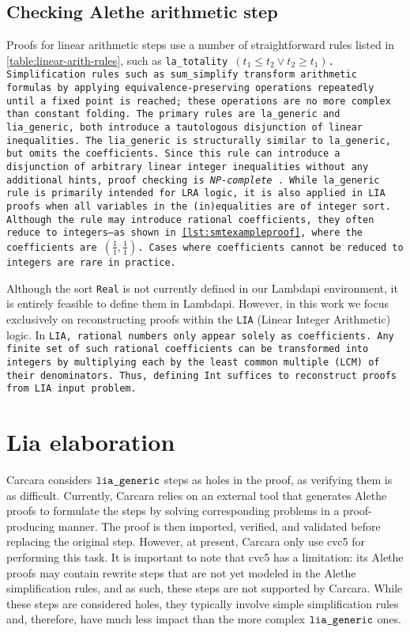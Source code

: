 \subsection{Checking Alethe arithmetic step}

Proofs for linear arithmetic steps use a number of straightforward rules listed in \cref{table:linear-arith-rules}, such as \tt{la\_totality} $(t_1 \leq t_2 \lor t_2 \geq t_1)$.
Simplification rules such as \tt{sum\_simplify} transform arithmetic formulas by applying equivalence-preserving operations repeatedly until a fixed point is reached; these operations are no more complex than constant folding.
The primary rules are \tt{la\_generic} and \tt{lia\_generic}, both introduce a tautologous disjunction of linear inequalities. The \tt{lia\_generic} is structurally similar to \tt{la\_generic}, but omits the coefficients.
Since this rule can introduce a disjunction of arbitrary linear integer inequalities without any additional hints, proof checking is \emph{NP-complete} \cite{Schrijver:lia}.
While \tt{la\_generic rule} is primarily intended for LRA logic, it is also applied in LIA proofs when all variables in the (in)equalities are of integer sort.
Although the rule may introduce rational coefficients, they often reduce to integers—as shown in \cref{lst:smtexampleproof}, where the coefficients are $(\frac{1}{1}, \frac{1}{1})$.
Cases where coefficients cannot be reduced to integers are rare in practice.

Although the sort \lstinline[language=SMT]{Real} is not currently defined in our Lambdapi environment, it is entirely feasible to define them in Lambdapi. However, in this work we focus exclusively on reconstructing proofs within the \texttt{LIA} (Linear Integer Arithmetic) logic.
In \tt{LIA}, rational numbers only appear solely as coefficients. Any finite set of such rational coefficients can be transformed into integers by multiplying each by the least common multiple (LCM) of their denominators.
Thus, defining \lstinline[language=SMT]{Int} suffices to reconstruct proofs from \tt{LIA} input problem.

\section{Lia elaboration}

Carcara considers $\tt{lia\_generic}$ steps as holes in the proof, as verifying them is as difficult.
Currently, Carcara relies on an external tool that generates Alethe proofs to formulate the steps by solving corresponding problems in a proof-producing manner.
The proof is then imported, verified, and validated before replacing the original step.
However, at present, Carcara only use cvc5 for performing this task.
It is important to note that cvc5 has a limitation: its Alethe proofs may contain rewrite steps that are not yet modeled in the Alethe simplification rules, and as such, these steps are not supported by Carcara.
While these steps are considered holes, they typically involve simple simplification rules and, therefore, have much less impact than the more complex $\tt{lia\_generic}$ ones.

